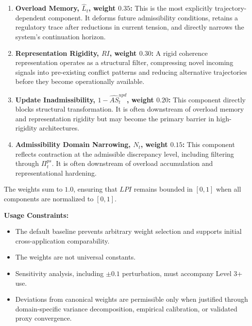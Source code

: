 \documentclass[11pt,a4paper]{article}
\theoremstyle{breakstyle}
\newcommand{\Lhat}{\widehat{L}}
\begin{document}
	\begin{enumerate}
		\item \textbf{Overload Memory, $\Lhat_t$, weight $0.35$:} This is the most explicitly trajectory-dependent component. It deforms future admissibility conditions, retains a regulatory trace after reductions in current tension, and directly narrows the system's continuation horizon.
		
		\item \textbf{Representation Rigidity, $RI$, weight $0.30$:} A rigid coherence representation operates as a structural filter, compressing novel incoming signals into pre-existing conflict patterns and reducing alternative trajectories before they become operationally available.
		
		\item \textbf{Update Inadmissibility, $1-\widehat{AS}^{upd}_t$, weight $0.20$:} This component directly blocks structural transformation. It is often downstream of overload memory and representation rigidity but may become the primary barrier in high-rigidity architectures.
		
		\item \textbf{Admissibility Domain Narrowing, $N_t$, weight $0.15$:} This component reflects contraction at the admissible discrepancy level, including filtering through $\Pi^{ps}_t$. It is often downstream of overload accumulation and representational hardening.
	\end{enumerate}
	
	The weights sum to $1.0$, ensuring that $LPI$ remains bounded in $[0,1]$ when all components are normalized to $[0,1]$.
	
	\textbf{Usage Constraints:}
	\begin{itemize}
		\item The default baseline prevents arbitrary weight selection and supports initial cross-application comparability.
		\item The weights are not universal constants.
		\item Sensitivity analysis, including $\pm 0.1$ perturbation, must accompany Level 3+ use.
		\item Deviations from canonical weights are permissible only when justified through domain-specific variance decomposition, empirical calibration, or validated proxy convergence.
	\end{itemize}
	
	
\end{document}

